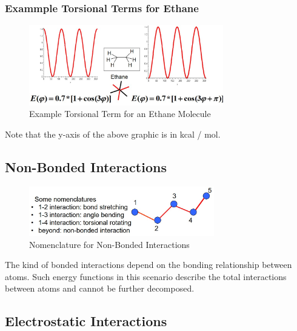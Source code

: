 \documentclass[
  letterpaper,
  DIV=11,
  numbers=noendperiod]{scrreprt}
\begin{document}
\hypertarget{exammple-torsional-terms-for-ethane}{%
\subsubsection{Exammple Torsional Terms for
Ethane}\label{exammple-torsional-terms-for-ethane}}

\begin{figure}

{\centering \includegraphics[width=3.33in,height=\textheight]{./images/wk2/ethane.jpg}

}

\caption{Example Torsional Term for an Ethane Molecule}

\end{figure}

Note that the y-axis of the above graphic is in kcal / mol.

\hypertarget{non-bonded-interactions}{%
\subsection{Non-Bonded Interactions}\label{non-bonded-interactions}}

\begin{figure}

{\centering \includegraphics[width=3.18in,height=\textheight]{./images/wk2/nonbond.jpg}

}

\caption{Nomenclature for Non-Bonded Interactions}

\end{figure}

The kind of bonded interactions depend on the bonding relationship
between atoms. Such energy functions in this scenario describe the total
interactions between atoms and cannot be further decomposed.

\hypertarget{electrostatic-interactions}{%
\subsection{Electrostatic
Interactions}\label{electrostatic-interactions}}
\end{document}
